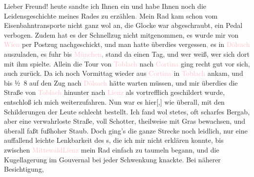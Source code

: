 \pstart
           Lieber Freund!{ }heute sandte ich Ihnen ein \label{K_L03128-1v}\label{K_L03128-1h} und habe Ihnen noch die Leidensgeschichte meines Rades zu
                  erzählen\textcolor{gray}{.} Mein Rad kam schon vom Eisenbahntransporte nicht ganz
               wol an, die Glocke war abgeschraubt, ein Pedal verbogen. Zudem hat es der Schnellzug
               nicht mitgenommen, es wurde mir von \textcolor{pink}{Wien}{}\ledrightnote{\textcolor{pink}{Wien}} per
               Postzug nachgeschickt, und man hatte überdies vergessen\textcolor{gray}{,} es in \textcolor{pink}{Dölsach}{}\ledrightnote{\textcolor{pink}{Dölsach}} auszuladen, es fuhr bis \textcolor{pink}{München}{}\ledrightnote{\textcolor{pink}{München}}\textcolor{gray}{,} stand da einen Tag, und wer weiß, wer sich dort mit ihm spielte.
               Allein die Tour von \textcolor{pink}{Toblach}{}\ledrightnote{\textcolor{pink}{Toblach}} nach \textcolor{pink}{Cortina}{}\ledrightnote{\textcolor{pink}{Cortina d'Ampezzo}} ging recht gut vor sich, auch zurück. Da ich noch
                  Vormittag wieder aus \textcolor{pink}{Cortina}{}\ledrightnote{\textcolor{pink}{Cortina d'Ampezzo}} in
                  \textcolor{pink}{Toblach}{}\ledrightnote{\textcolor{pink}{Toblach}} ankam, und bis ½ 8 auf
               den Zug nach \textcolor{pink}{Dölsach}{}\ledrightnote{\textcolor{pink}{Dölsach}} hätte warten müssen, und mir
               überdies die Straße von \textcolor{pink}{Toblach}{}\ledrightnote{\textcolor{pink}{Toblach}} hinunter nach \textcolor{pink}{Lienz}{}\ledrightnote{\textcolor{pink}{Lienz}} als vortrefflich geschildert wurde,
               entschloß ich mich weiterzufahren. Nun war es hier{[},{]}{ }{\pb}wie überall, mit den
               Schilderungen der Leute schlecht bestellt. Ich fand wol stetes, oft scharfes Bergab,
               aber eine verwahrloste Straße, voll Schotter, theilweise mit Gras bewachsen, und
               überall faßt fußhoher Staub. Doch ging’s die ganze Strecke noch leidlich, nur eine
               auffallend leichte Lenkbarkeit des \label{K_L03128-2v}\label{K_L03128-2h}s, die
               ich mir nicht erklären konnte, bis zwischen \textcolor{pink}{Mittewald}{}\ledrightnote{\textcolor{pink}{Mittewald an der Drau}}{ }{\kaufmannsund}{ }\textcolor{pink}{Lienz}{}\ledrightnote{\textcolor{pink}{Lienz}} mein Rad einfach zu taumeln begann, und die
               Kugellagerung im Gouvernal bei jeder Schwenkung knackte. Bei näherer Besichtigung,
